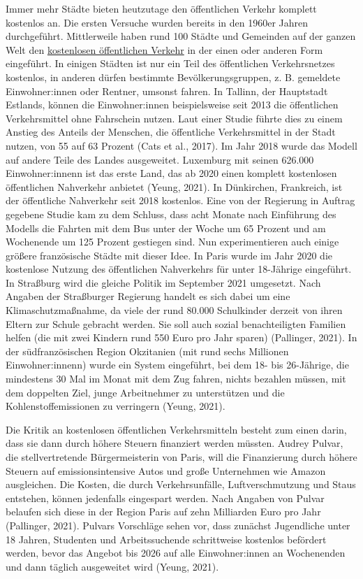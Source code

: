 \documentclass[
]{book}
\begin{document}
Immer mehr Städte bieten heutzutage den öffentlichen Verkehr komplett kostenlos an. Die ersten Versuche wurden bereits in den 1960er Jahren durchgeführt. Mittlerweile haben rund 100 Städte und Gemeinden auf der ganzen Welt den \href{https://freepublictransport.info/city/}{kostenlosen öffentlichen Verkehr} in der einen oder anderen Form eingeführt. In einigen Städten ist nur ein Teil des öffentlichen Verkehrsnetzes kostenlos, in anderen dürfen bestimmte Bevölkerungsgruppen, z. B. gemeldete Einwohner:innen oder Rentner, umsonst fahren. In Tallinn, der Hauptstadt Estlands, können die Einwohner:innen beispielsweise seit 2013 die öffentlichen Verkehrsmittel ohne Fahrschein nutzen. Laut einer Studie führte dies zu einem Anstieg des Anteils der Menschen, die öffentliche Verkehrsmittel in der Stadt nutzen, von 55 auf 63 Prozent (Cats et al., 2017). Im Jahr 2018 wurde das Modell auf andere Teile des Landes ausgeweitet. Luxemburg mit seinen 626.000 Einwohner:innenn ist das erste Land, das ab 2020 einen komplett kostenlosen öffentlichen Nahverkehr anbietet (Yeung, 2021). In Dünkirchen, Frankreich, ist der öffentliche Nahverkehr seit 2018 kostenlos. Eine von der Regierung in Auftrag gegebene Studie kam zu dem Schluss, dass acht Monate nach Einführung des Modells die Fahrten mit dem Bus unter der Woche um 65 Prozent und am Wochenende um 125 Prozent gestiegen sind. Nun experimentieren auch einige größere französische Städte mit dieser Idee. In Paris wurde im Jahr 2020 die kostenlose Nutzung des öffentlichen Nahverkehrs für unter 18-Jährige eingeführt. In Straßburg wird die gleiche Politik im September 2021 umgesetzt. Nach Angaben der Straßburger Regierung handelt es sich dabei um eine Klimaschutzmaßnahme, da viele der rund 80.000 Schulkinder derzeit von ihren Eltern zur Schule gebracht werden. Sie soll auch sozial benachteiligten Familien helfen (die mit zwei Kindern rund 550 Euro pro Jahr sparen) (Pallinger, 2021). In der südfranzösischen Region Okzitanien (mit rund sechs Millionen Einwohner:innenn) wurde ein System eingeführt, bei dem 18- bis 26-Jährige, die mindestens 30 Mal im Monat mit dem Zug fahren, nichts bezahlen müssen, mit dem doppelten Ziel, junge Arbeitnehmer zu unterstützen und die Kohlenstoffemissionen zu verringern (Yeung, 2021).

Die Kritik an kostenlosen öffentlichen Verkehrsmitteln besteht zum einen darin, dass sie dann durch höhere Steuern finanziert werden müssten. Audrey Pulvar, die stellvertretende Bürgermeisterin von Paris, will die Finanzierung durch höhere Steuern auf emissionsintensive Autos und große Unternehmen wie Amazon ausgleichen. Die Kosten, die durch Verkehrsunfälle, Luftverschmutzung und Staus entstehen, können jedenfalls eingespart werden. Nach Angaben von Pulvar belaufen sich diese in der Region Paris auf zehn Milliarden Euro pro Jahr (Pallinger, 2021). Pulvars Vorschläge sehen vor, dass zunächst Jugendliche unter 18 Jahren, Studenten und Arbeitssuchende schrittweise kostenlos befördert werden, bevor das Angebot bis 2026 auf alle Einwohner:innen an Wochenenden und dann täglich ausgeweitet wird (Yeung, 2021).
\end{document}
